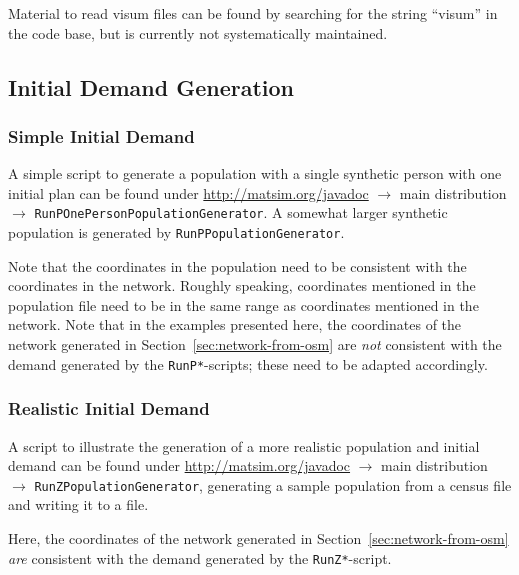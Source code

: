 Material to read \gls{visum} files can be found by searching for the string ``visum'' in the code base, but is currently not systematically maintained.



\subsection{Initial Demand Generation}
\label{sec:extending-initial-demand}

\subsubsection{Simple Initial Demand}

A simple script to generate a population with a single synthetic person with one initial plan can be found under \url{http://matsim.org/javadoc} $\to$ main distribution $\to$ \lstinline{RunPOnePersonPopulationGenerator}.   A somewhat larger synthetic population is generated by \lstinline{RunPPopulationGenerator}.

Note that the coordinates in the population need to be consistent with the coordinates in the network.  Roughly speaking, coordinates mentioned in the population file need to be in the same range as coordinates mentioned in the network.  Note that in the examples presented here, the coordinates of the network generated in Section~\ref{sec:network-from-osm} are \emph{not} consistent with the demand generated by the \lstinline{RunP*}-scripts; these need to be adapted accordingly.

\subsubsection{Realistic Initial Demand}

A script to illustrate the generation of a more realistic population and initial demand can be found under \url{http://matsim.org/javadoc} $\to$ main distribution $\to$ \lstinline{RunZPopulationGenerator}, generating a sample population from a census file and writing it to a file.

Here, the coordinates of the network generated in Section~\ref{sec:network-from-osm} \emph{are} consistent with the demand generated by the \lstinline{RunZ*}-script.



